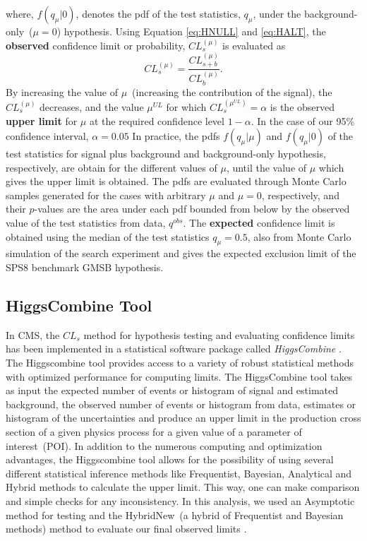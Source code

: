 where, $f(q_{\mu}|0)$, denotes the pdf of the test statistics, $q_{\mu}$, under the background-only~($\mu = 0$) hypothesis.
Using Equation \ref{eq:HNULL} and \ref{eq:HALT}, the \textbf{observed} confidence limit or probability, $ CL^{(\mu)}_{s} $ is evaluated as
\begin{equation}
CL^{(\mu)}_{s} = \frac{CL^{(\mu)}_{s+b} }{ CL^{(\mu)}_{b}}.
\end{equation}
By increasing the value of $\mu$~(increasing the contribution of the signal), the $CL^{(\mu)}_{s}$ decreases, and the value $\mu^{UL}$ for which $CL^{(\mu^{UL})}_{s} = \alpha$ is the observed \textbf{upper limit} for $\mu$ at the required confidence level $1 - \alpha$. In the case of our 95\% confidence interval, $\alpha = 0.05$
\newline
In practice, the pdfs $f(q_{\mu}|\mu)$ and $f(q_{\mu}|0)$ of the test statistics for signal plus background and  background-only hypothesis, respectively, are obtain for the different values of $\mu$, until the value of $\mu$ which gives the upper limit is obtained. The pdfs are evaluated through Monte Carlo samples generated for the cases with arbitrary $\mu $ and $\mu = 0$, respectively, and their $p$-values are the area under each pdf bounded from below by the observed value of the test statistics from data, $q^{obs}$.
\newline
The \textbf{expected} confidence limit is obtained using the median of the test statistics $q_{\mu} = 0.5$, also from Monte Carlo simulation of the search experiment and gives the expected exclusion limit of the SPS8 benchmark GMSB  hypothesis.  
\subsection{HiggsCombine Tool}
In CMS, the $CL_{s}$ method for hypothesis testing and evaluating confidence limits has been implemented in a statistical software package called \textit{HiggsCombine} \cite{LIMITS}. The Higgscombine tool provides access to a variety of robust statistical methods with optimized performance for computing limits. The HiggsCombine tool takes as input the expected number of events or histogram of signal and estimated  background, the observed number of events or histogram from data, estimates or histogram of the uncertainties and produce an upper limit in the production cross section of a given physics process for a given value of a parameter of interest~(POI). In addition to the numerous computing and optimization advantages, the Higgscombine tool allows for the possibility of using several different statistical inference methods like Frequentist, Bayesian, Analytical and Hybrid methods to calculate the upper limit. This way, one can make comparison and simple checks for any inconsistency. In this analysis, we used an Asymptotic method for testing and the HybridNew~(a hybrid of Frequentist and Bayesian methods) method  to evaluate our final observed  limits \cite{LIMITS,ASYMP}. 

